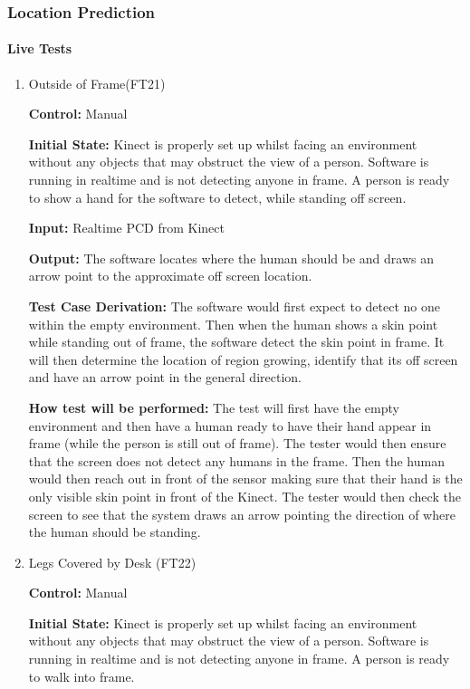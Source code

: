 \documentclass[12pt, titlepage]{article}
\begin{document}
\subsubsection{Location Prediction}

\paragraph{Live Tests}
\begin{enumerate}
  \item{Outside of Frame(FT21)\label{FT21}\\}

  \textbf{Control:} Manual

  \textbf{Initial State:} Kinect is properly set up whilst facing an environment without any objects that may obstruct the view of a person. Software is running in realtime and is not detecting anyone in frame. A person is ready to show a hand for the software to detect, while standing off screen.
  
  \textbf{Input:} Realtime PCD from Kinect
  
  \textbf{Output:} The software locates where the human should be and draws an arrow point to the approximate off screen location.
  
  \textbf{Test Case Derivation:}  The software would first expect to detect no one within the empty environment. Then when the human shows a skin point while standing out of frame, the software detect the skin point in frame. It will then determine the location of region growing, identify that its off screen and have an arrow point in the general direction.
  
  \textbf{How test will be performed:} The test will first have the empty environment and then have a human ready to have their hand appear in frame (while the person is still out of frame). The tester would then ensure that the screen does not detect any humans in the frame. Then the human would then reach out in front of the sensor making sure that their hand is the only visible skin point in front of the Kinect. The tester would then check the screen to see that the system draws an arrow pointing the direction of where the human should be standing.

  \item{Legs Covered by Desk (FT22)\label{FT22}\\}
  
  \textbf{Control:} Manual
  
  \textbf{Initial State:} Kinect is properly set up whilst facing an environment without any objects that may obstruct the view of a person. Software is running in realtime and is not detecting anyone in frame. A person is ready to walk into frame.
  

\end{enumerate}
\end{document}
